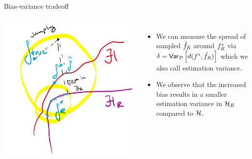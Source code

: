\documentclass[11pt,compress,t,notes=noshow, xcolor=table]{beamer}
\begin{document}
\begin{vbframe}{Bias-variance tradeoff}
\begin{columns}[onlytextwidth,T]
  \includegraphics[width=1.0\textwidth]{slides/regularization/figure_man/to_replace_estimation_variance_res.png}

      \lz 
      \begin{itemize}
          \item We can measure the spread of sampled $\hat{f}_R$ around $f^{\ast}_R$ via $\delta = \mathsf{Var}_{\mathcal{D}}\left[d(f^{\ast}, \hat{f}_R)\right]$ which we also call estimation variance.
          \item We observe that the increased bias results in a smaller estimation variance in $\mathcal{H}_R$ compared to $\mathcal{H}.$
      \end{itemize}
    \end{columns}

\end{vbframe}



\endlecture
\end{document}
